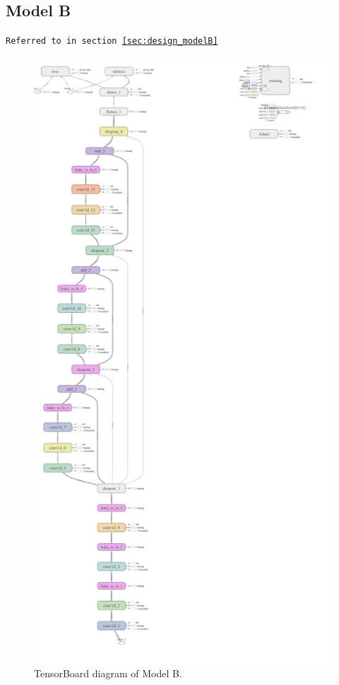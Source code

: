 \begin{appendices}
        \subsection{Model B}
        \label{app:modelB_diagram}
        \texttt{Referred to in section \ref{sec:design_modelB}}
        \begin{figure}[H]
            \centering
            \includegraphics[height=0.85\textheight]{figures/modelB_diagram.png}
            \caption*{TensorBoard diagram of Model B.}
        \end{figure}
        

\end{appendices}
